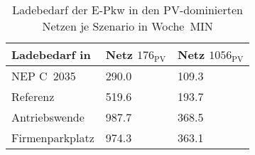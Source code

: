 {
\renewcommand{\arraystretch}{1.2}%
\begin{table}[H]
	\begin{center}
		\caption{Ladebedarf der E-Pkw in den PV-dominierten Netzen je Szenario in Woche~MIN}
		\begin{tabu} to 0.6\textwidth {X[1.5] X[1, r] X[1, r]}
			\toprule
			Ladebedarf in   \si{\mwh} 		& Netz \(176_{\text{PV}}\) & Netz \(1056_{\text{PV}}\) \\ \midrule
			NEP C~\num{2035}                & \num{290.0}    & \num{109.3}     \\
			Referenz                        & \num{519.6}    & \num{193.7}     \\
			Antriebswende                   & \num{987.7}    & \num{368.5}     \\
			\glqq Firmenparkplatz\grqq{}    & \num{974.3}    & \num{363.1}     \\ \bottomrule
		\end{tabu}
		\label{tab:pv_dominated_epkw_demand}
	\end{center}
	\vspace{-3mm}%
\end{table}
}